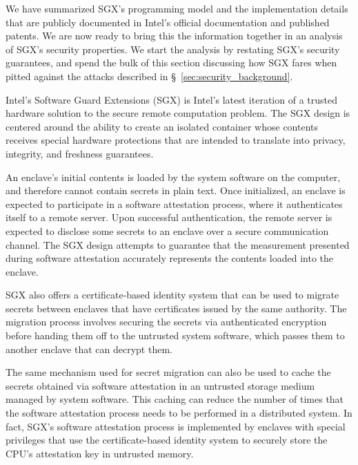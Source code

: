 \label{sec:sgx_security_analysis}

We have summarized SGX's programming model and the implementation details
that are publicly documented in Intel's official documentation and published
patents. We are now ready to bring this the information together in an analysis
of SGX's security properties. We start the analysis by restating SGX's
security guarantees, and spend the bulk of this section discussing how SGX
fares when pitted against the attacks described in
\S~\ref{sec:security_background}.



Intel's Software Guard Extensions (SGX) is Intel's latest iteration of a
trusted hardware solution to the secure remote computation problem. The SGX
design is centered around the ability to create an isolated container whose
contents receives special hardware protections that are intended to translate
into privacy, integrity, and freshness guarantees.


An enclave's initial contents is loaded by the system software on the computer,
and therefore cannot contain secrets in plain text. Once initialized, an
enclave is expected to participate in a software attestation process, where it
authenticates itself to a remote server. Upon successful authentication, the
remote server is expected to disclose some secrets to an enclave over a
secure communication channel. The SGX design attempts to guarantee that the
measurement presented during software attestation accurately represents the
contents loaded into the enclave.

SGX also offers a certificate-based identity system that can be used to migrate
secrets between enclaves that have certificates issued by the same authority.
The migration process involves securing the secrets via authenticated
encryption before handing them off to the untrusted system software, which
passes them to another enclave that can decrypt them.

The same mechanism used for secret migration can also be used to cache the
secrets obtained via software attestation in an untrusted storage medium
managed by system software. This caching can reduce the number of times that
the software attestation process needs to be performed in a distributed system.
In fact, SGX's software attestation process is implemented by enclaves with
special privileges that use the certificate-based identity system to securely
store the CPU's attestation key in untrusted memory.


